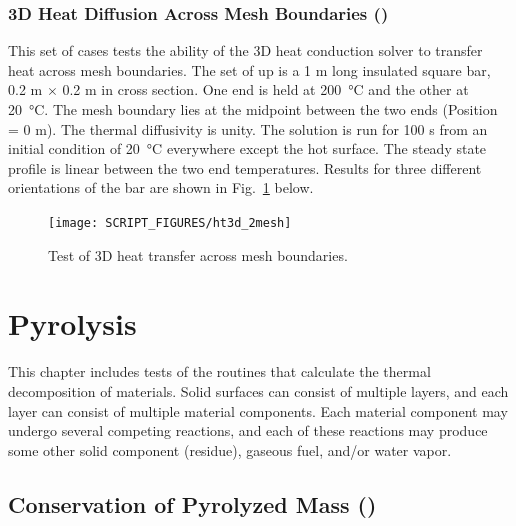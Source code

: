 \documentclass[11pt]{book}
\begin{document}
\clearpage

\subsection{3D Heat Diffusion Across Mesh Boundaries (\texorpdfstring{}{ht3d\_2mesh})}
\label{sec:ht3d_2mesh}
\label{ht3d_2mesh_x}
\label{ht3d_2mesh_y}
\label{ht3d_2mesh_z}

This set of cases tests the ability of the 3D heat conduction solver to transfer heat across mesh boundaries.  The set of up is a 1 m long insulated square bar, 0.2 m $\times$ 0.2 m in cross section.  One end is held at \SI{200}{\degreeCelsius} and the other at \SI{20}{\degreeCelsius}.  The mesh boundary lies at the midpoint between the two ends (Position = 0 m).  The thermal diffusivity is unity.  The solution is run for 100 s from an initial condition of \SI{20}{\degreeCelsius} everywhere except the hot surface.  The steady state profile is linear between the two end temperatures.  Results for three different orientations of the bar are shown in Fig.~\ref{fig:ht3d_2mesh} below.

\begin{figure}[ht]
\centering
\texttt{[image: SCRIPT\_FIGURES/ht3d\_2mesh]}
\caption[The  test cases]{Test of 3D heat transfer across mesh boundaries.}
\label{fig:ht3d_2mesh}
\end{figure}


\chapter{Pyrolysis}

This chapter includes tests of the routines that calculate the thermal decomposition of materials. Solid surfaces can consist of multiple layers, and each layer can consist of multiple material components. Each material component may undergo several competing reactions, and each of these reactions may produce some other solid component (residue), gaseous fuel, and/or water vapor.

\section{Conservation of Pyrolyzed Mass (\texorpdfstring{}{surf\_mass\_conservation})}
\end{document}
